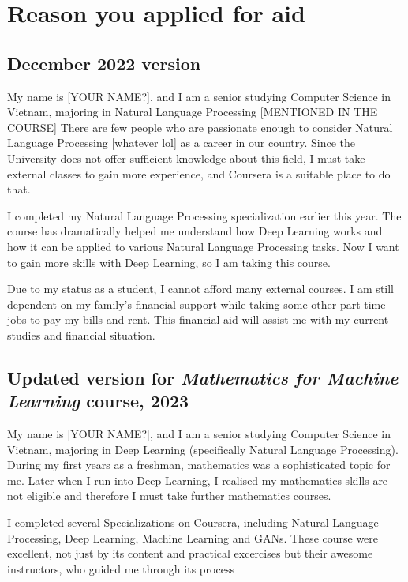 \section{Reason you applied for aid}

\subsection{December 2022 version}
My name is [YOUR NAME?], and I am a senior studying Computer Science in Vietnam, majoring in Natural Language Processing [MENTIONED IN THE COURSE] There are few people who are passionate enough to consider Natural Language Processing [whatever lol] as a career in our country. Since the University does not offer sufficient knowledge about this field, I must take external classes to gain more experience, and Coursera is a suitable place to do that. 

I completed my Natural Language Processing specialization earlier this year. The course has dramatically helped me understand how Deep Learning works and how it can be applied to various Natural Language Processing tasks. Now I want to gain more skills with Deep Learning, so I am taking this course. 

Due to my status as a student, I cannot afford many external courses. I am still dependent on my family's financial support while taking some other part-time jobs to pay my bills and rent. This financial aid will assist me with my current studies and financial situation.

\subsection{Updated version for \textit{Mathematics for Machine Learning} course, 2023}

My name is [YOUR NAME?], and I am a senior studying Computer Science in Vietnam, majoring in Deep Learning (specifically Natural Language Processing). During my first years as a freshman, mathematics was a sophisticated topic for me. Later when I run into Deep Learning, I realised my mathematics skills are not eligible and therefore I must take further mathematics courses.

I completed several Specializations on Coursera, including Natural Language Processing, Deep Learning, Machine Learning and GANs. These course were excellent, not just by its content and practical excercises but their awesome instructors, who guided me through its process